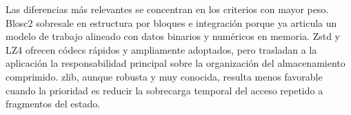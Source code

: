Las diferencias más relevantes se concentran en los criterios con mayor peso. Blosc2
sobresale en estructura por bloques e integración porque ya articula un modelo de trabajo
alineado con datos binarios y numéricos en memoria. Zstd y LZ4 ofrecen códecs rápidos
y ampliamente adoptados, pero trasladan a la aplicación la responsabilidad principal
sobre la organización del almacenamiento comprimido. zlib, aunque robusta y muy
conocida, resulta menos favorable cuando la prioridad es reducir la sobrecarga temporal
del acceso repetido a fragmentos del estado.
